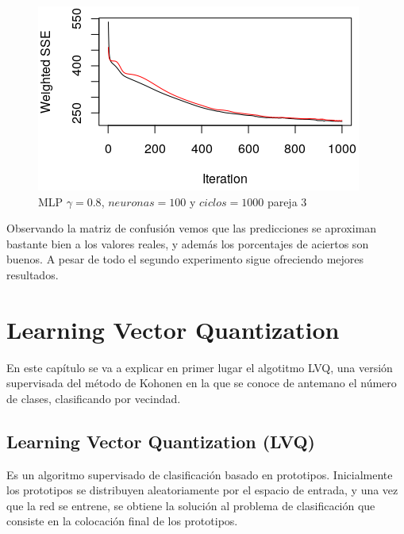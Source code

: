 \documentclass[11pt,spanish,listoffigures,listoftables]{workluis}
\begin{document}
\begin{figure}[H]
\centering
\includegraphics[scale=0.5]{081003}
\caption{MLP $\gamma = 0.8$, $neuronas = 100$ y $ciclos = 1000$ pareja 3}
\end{figure} 

\par Observando la matriz de confusión vemos que las predicciones se aproximan bastante bien a los valores reales, y además los porcentajes de aciertos son buenos. A pesar de todo el segundo experimento sigue ofreciendo mejores resultados. 


\chapter{Learning Vector Quantization}

\par En este capítulo se va a explicar en primer lugar el algotitmo LVQ, una versión supervisada del método de Kohonen en la que se conoce de antemano el número de clases, clasificando por vecindad.

\section{Learning Vector Quantization (LVQ)}

\par Es un algoritmo supervisado de clasificación basado en prototipos. Inicialmente los prototipos se distribuyen aleatoriamente por el espacio de entrada, y una vez que la red se entrene, se obtiene la solución al problema de clasificación que consiste en la colocación final de los prototipos.
\end{document}
